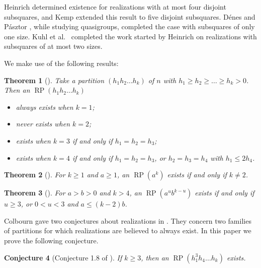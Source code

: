 \documentclass{sn-jnl}
\newtheorem{theorem}{Theorem}[section]
\newtheorem{conjecture}[theorem]{Conjecture}
\theoremstyle{definition}
\DeclareMathOperator{\LS}{RP}
\begin{document}
Heinrich \cite{heinrich2006latin} determined existence for realizations with at most four disjoint subsquares, and Kemp \cite{kemp2024latin} extended this result to five disjoint subsquares.  D{\'e}nes and P{\'a}sztor \cite{denes1963some}, while studying quasigroups, completed the case with subsquares of only one size. Kuhl et al.~\cite{kuhl2018latin} completed the work started by Heinrich \cite{heinrich1982disjoint} on realizations with subsquares of at most two sizes.

We make use of the following results:

\begin{theorem}[\cite{heinrich2006latin}]
\label{thm: small k squares}
    Take a partition $(h_1h_2\dots h_k)$ of $n$ with $h_1\geq h_2\geq \dots\geq h_k > 0$. Then an $\LS(h_1h_2\dots h_k)$
    \begin{itemize}
        \item always exists when $k=1$;
        \item never exists when $k=2$;
        \item exists when $k=3$ if and only if $h_1=h_2=h_3$;
        \item exists when $k=4$ if and only if $h_1=h_2=h_3$, or $h_2=h_3=h_4$ with $h_1\leq 2h_4$.
    \end{itemize}
\end{theorem}

\begin{theorem}[\cite{denes1963some}]
\label{thm: a^k square}
    For $k\geq 1$ and $a\geq 1$, an $\LS(a^k)$ exists if and only if $k\neq 2$.
\end{theorem}

\begin{theorem}[\cite{heinrich1982disjoint,kuhl2018latin}]
\label{thm: squaresatmost2}
    For $a>b>0$ and $k>4$, an $\LS(a^ub^{k-u})$ exists if and only if $u\geq 3$, or $0< u < 3$ and $a\leq (k-2)b$.
\end{theorem}

Colbourn gave two conjectures about realizations in \cite{colbourn2018latin}. They concern two families of partitions for which realizations are believed to always exist. In this paper we prove the following conjecture.

\begin{conjecture}[Conjecture 1.8 of \cite{colbourn2018latin}]
\label{conj: largest 3}
    If $k\geq 3$, then an $\LS(h_1^3h_4\dots h_k)$ exists.
\end{conjecture}
\end{document}
